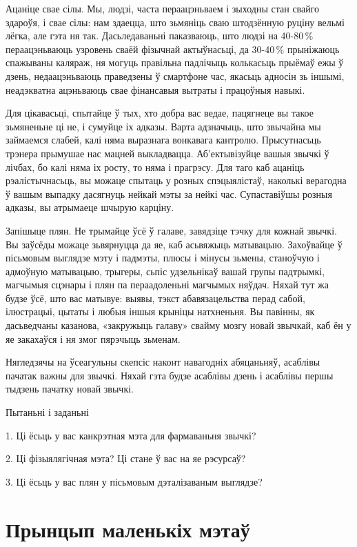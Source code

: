 Ацаніце свае сілы. Мы, людзі, часта пераацэньваем і зыходны стан свайго здароўя, і свае сілы: нам здаецца, што зьмяніць сваю штодзённую руціну вельмі лёгка, але гэта ня так. Дасьледаваньні паказваюць, што людзі на 40-80\,\% пераацэньваюць узровень сваёй фізычнай актыўнасьці, да 30-40\,\% прыніжаюць спажываны каляраж, ня могуць правільна падлічыць колькасьць прыёмаў ежы ў дзень, недаацэньваюць праведзены ў смартфоне час, якасьць адносін зь іншымі, неадэкватна ацэньваюць свае фінансавыя вытраты і працоўныя навыкі.

Для цікавасьці, спытайце ў тых, хто добра вас ведае, пацягнеце вы такое зьмяненьне ці не, і сумуйце іх адказы. Варта адзначыць, што звычайна мы займаемся слабей, калі няма выразнага вонкавага кантролю. Прысутнасьць трэнера прымушае нас мацней выкладвацца. Аб'ектывізуйце вашыя звычкі ў лічбах, бо калі няма іх росту, то няма і прагрэсу. Для таго каб ацаніць рэалістычнасьць, вы можаце спытаць у розных спэцыялістаў, наколькі верагодна ў вашым выпадку дасягнуць нейкай мэты за нейкі час. Супаставіўшы розныя адказы, вы атрымаеце шчырую карціну.

Запішыце плян. Не трымайце ўсё ў галаве, завядзіце тэчку для кожнай звычкі. Вы заўсёды можаце зьвярнуцца да яе, каб асьвяжыць матывацыю. Захоўвайце ў пісьмовым выглядзе мэту і падмэты, плюсы і мінусы зьмены, станоўчую і адмоўную матывацыю, трыгеры, сьпіс удзельнікаў вашай групы падтрымкі, магчымыя сцэнары і плян па пераадоленьні магчымых няўдач. Няхай тут жа будзе ўсё, што вас матывуе: выявы, тэкст абавязацельства перад сабой, ілюстрацыі, цытаты і любыя іншыя крыніцы натхненьня. Вы павінны, як дасьведчаны казанова, «закружыць галаву» свайму мозгу новай звычкай, каб ён у яе закахаўся і ня змог пярэчыць зьменам.

Нягледзячы на ўсеагульны скепсіс наконт навагодніх абяцаньняў, асаблівы пачатак важны для звычкі. Няхай гэта будзе асаблівы дзень і асаблівы першы тыдзень пачатку новай звычкі.

Пытаньні і заданьні

1. Ці ёсьць у вас канкрэтная мэта для фармаваньня звычкі?

2. Ці фізыялягічная мэта? Ці стане ў вас на яе рэсурсаў?

3. Ці ёсьць у вас плян у пісьмовым дэталізаваным выглядзе?


\section{Прынцып маленькіх мэтаў}

